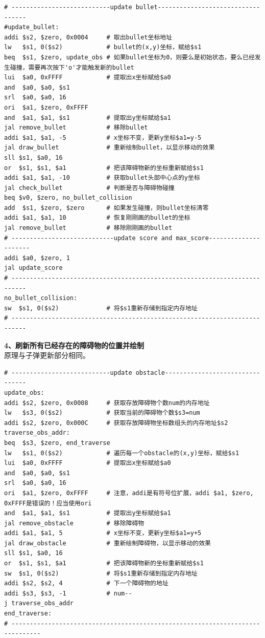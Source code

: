 \begin{lstlisting}[frame=shadowbox]
# ---------------------------update bullet----------------------------------
#update_bullet:
addi $s2, $zero, 0x0004     # 取出bullet坐标地址
lw   $s1, 0($s2)            # bullet的(x,y)坐标，赋给$s1
beq  $s1, $zero, update_obs # 如果bullet坐标为0，则要么是初始状态，要么已经发生碰撞，需要再次按下'o'才能触发新的bullet
lui  $a0, 0xFFFF            # 提取出x坐标赋给$a0
and  $a0, $a0, $s1
srl  $a0, $a0, 16
ori  $a1, $zero, 0xFFFF     
and  $a1, $a1, $s1          # 提取出y坐标赋给$a1
jal remove_bullet           # 移除bullet
addi $a1, $a1, -5           # x坐标不变，更新y坐标$a1=y-5
jal draw_bullet             # 重新绘制bullet，以显示移动的效果
sll $s1, $a0, 16
or  $s1, $s1, $a1           # 把该障碍物新的坐标重新赋给$s1
addi $a1, $a1, -10          # 获取bullet头部中心点的y坐标
jal check_bullet            # 判断是否与障碍物碰撞
beq $v0, $zero, no_bullet_collision
add  $s1, $zero, $zero      # 如果发生碰撞，则bullet坐标清零
addi $a1, $a1, 10           # 恢复刚刚画的bullet的坐标
jal remove_bullet           # 移除刚刚画的bullet
# ----------------------------update score and max_score---------------------
addi $a0, $zero, 1
jal update_score
# --------------------------------------------------------------------------
no_bullet_collision:
sw  $s1, 0($s2)             # 将$s1重新存储到指定内存地址
# --------------------------------------------------------------------------
\end{lstlisting}

\textbf{4、刷新所有已经存在的障碍物的位置并绘制}\\
原理与子弹更新部分相同。\\

\begin{lstlisting}[frame=shadowbox]
# ---------------------------update obstacle--------------------------------
update_obs:
addi $s2, $zero, 0x0008     # 获取存放障碍物个数num的内存地址
lw   $s3, 0($s2)            # 获取当前的障碍物个数$s3=num
addi $s2, $zero, 0x000C     # 获取存放障碍物坐标数组头的内存地址$s2
traverse_obs_addr:
beq  $s3, $zero, end_traverse
lw   $s1, 0($s2)            # 遍历每一个obstacle的(x,y)坐标，赋给$s1
lui  $a0, 0xFFFF            # 提取出x坐标赋给$a0
and  $a0, $a0, $s1
srl  $a0, $a0, 16
ori  $a1, $zero, 0xFFFF     # 注意，addi是有符号位扩展，addi $a1, $zero, 0xFFFF是错误的！应当使用ori
and  $a1, $a1, $s1          # 提取出y坐标赋给$a1
jal remove_obstacle         # 移除障碍物
addi $a1, $a1, 5            # x坐标不变，更新y坐标$a1=y+5
jal draw_obstacle           # 重新绘制障碍物，以显示移动的效果
sll $s1, $a0, 16
or  $s1, $s1, $a1           # 把该障碍物新的坐标重新赋给$s1
sw  $s1, 0($s2)             # 将$s1重新存储到指定内存地址
addi $s2, $s2, 4            # 下一个障碍物的地址
addi $s3, $s3, -1           # num--
j traverse_obs_addr
end_traverse:
# ------------------------------------------------------------------------------
\end{lstlisting}

